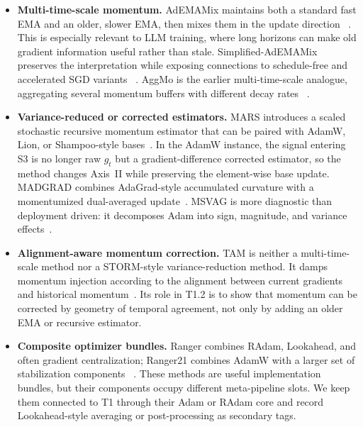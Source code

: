 \begin{itemize}
  \setlength{\itemsep}{2pt}
  \item \textbf{Multi-time-scale momentum.}  AdEMAMix maintains both a standard
  fast EMA and an older, slower EMA, then mixes them in the update direction
  ~\citep{pagliardini2024ademamix}.  This is especially relevant to LLM
  training, where long horizons can make old gradient information useful
  rather than stale.  Simplified-AdEMAMix preserves the interpretation while
  exposing connections to schedule-free and accelerated SGD variants
  ~\citep{morwani2025connections}.  AggMo is the earlier multi-time-scale
  analogue, aggregating several momentum buffers with different decay rates
  ~\citep{lucas2018aggmo}.
  \item \textbf{Variance-reduced or corrected estimators.}  MARS introduces a
  scaled stochastic recursive momentum estimator that can be paired with AdamW,
  Lion, or Shampoo-style bases~\citep{yuan2024mars}.  In the AdamW instance,
  the signal entering S3 is no longer raw $g_t$ but a gradient-difference
  corrected estimator, so the method changes Axis~II while preserving the
  element-wise base update.  MADGRAD combines AdaGrad-style accumulated
  curvature with a momentumized dual-averaged update~\citep{defazio2022madgrad}.
  MSVAG is more diagnostic than deployment driven: it decomposes Adam into
  sign, magnitude, and variance effects~\citep{balles2018dissecting}.
  \item \textbf{Alignment-aware momentum correction.}  TAM is neither a
  multi-time-scale method nor a STORM-style variance-reduction method.  It
  damps momentum injection according to the alignment between current gradients
  and historical momentum~\citep{malviya2024torque}.  Its role in T1.2 is to show
  that momentum can be corrected by geometry of temporal agreement, not only
  by adding an older EMA or recursive estimator.
  \item \textbf{Composite optimizer bundles.}  Ranger combines RAdam,
  Lookahead, and often gradient centralization; Ranger21 combines AdamW with a
  larger set of stabilization components
  ~\citep{zhang2019lookahead,wright2021ranger21}.  These methods are useful
  implementation bundles, but their components occupy different meta-pipeline
  slots.  We keep them connected to T1 through their Adam or RAdam core and record
  Lookahead-style averaging or post-processing as secondary tags.
\end{itemize}

